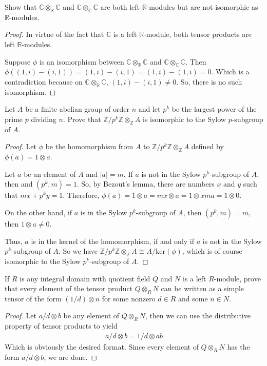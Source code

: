 \documentclass[10pt]{article}
\newcommand{\Z}{\mathbb{Z}}
\newcommand{\R}{\mathbb{R}}
\newcommand{\C}{\mathbb{C}}
\newenvironment{problem}[2][Problem]{\begin{trivlist}
		\item[\hskip \labelsep {\bfseries #1}\hskip \labelsep {\bfseries #2.}]}{\end{trivlist}}
\begin{document}
	\begin{problem}{4.3}
		Show that $\C \otimes_\R \C$ and $\C \otimes_\C \C$ are both left $\R$-modules but are not isomorphic as $\R$-modules.
		\begin{proof}
			In virtue of the fact that $\C$ is a left $\R$-module, both tensor products are left $\R$-modules.
			
			Suppose $\phi$ is an isomorphism between $\C \otimes_\R \C$ and $\C \otimes_\C \C$. Then $\phi((1,i)-(i,1)) = (1,i) - (i,1) = (1,i)-(1,i)=0$. Which is a contradiction because on $\C \otimes_\R \C$, $(1,i)-(i,1) \not = 0$. So, there is no such isomorphism.
		\end{proof}
	\end{problem}
	
	\begin{problem}{4.5}
		Let $A$ be a finite abelian group of order $n$ and let $p^k$ be the largest power of the prime $p$ dividing $n$. Prove that $\Z/p^k\Z \otimes_\Z A$ is isomorphic to the Sylow $p$-subgroup of $A$.
		\begin{proof}
			Let $\phi$ be the homomorphism from $A$ to $\Z/p^k\Z \otimes_\Z A$ defined by $\phi(a) = 1\otimes a$.
			
			Let $a$ be an element of $A$ and $|a|=m$. If $a$ is not in the Sylow $p^k$-subgroup of $A$, then  and $(p^k, m) = 1$. So, by Bezout's lemma, there are numbers $x$ and $y$ such that $mx+p^ky = 1$. Therefore, $\phi(a) = 1\otimes a = mx \otimes a = 1 \otimes xma = 1 \otimes 0$.
			
			On the other hand, if $a$ is in the Sylow $p^k$-subgroup of $A$, then $(p^k, m)=m$, then $1 \otimes a \not = 0$. 
			
			Thus, $a$ is in the kernel of the homomorphism, if and only if $a$ is not in the Sylow $p^k$-subgroup of $A$. So we have $\Z/p^k\Z \otimes_\Z A \cong A/\text{ker}(\phi)$, which is of course isomorphic to the Sylow $p^k$-subgroup of $A$.
		\end{proof}
	\end{problem}
	
	\begin{problem}{4.7}
		If $R$ is any integral domain with quotient field $Q$ and $N$ is a left $R$-module, prove that every element of the tensor product $Q \otimes_R N$ can be written as a simple tensor of the form $(1/d) \otimes n$ for some nonzero $d \in R$ and some $n \in N$.
		\begin{proof}
			Let $a/d \otimes b$ be any element of $Q \otimes_R N$, then we can use the distributive property of tensor products to yield
			\begin{align*}
				a/d \otimes b = 1/d \otimes ab
			\end{align*}
			Which is obviously the desired format. Since every element of $Q \otimes_R N$ has the form $a/d \otimes b$, we are done.
		\end{proof}
	\end{problem}
	
\end{document}
